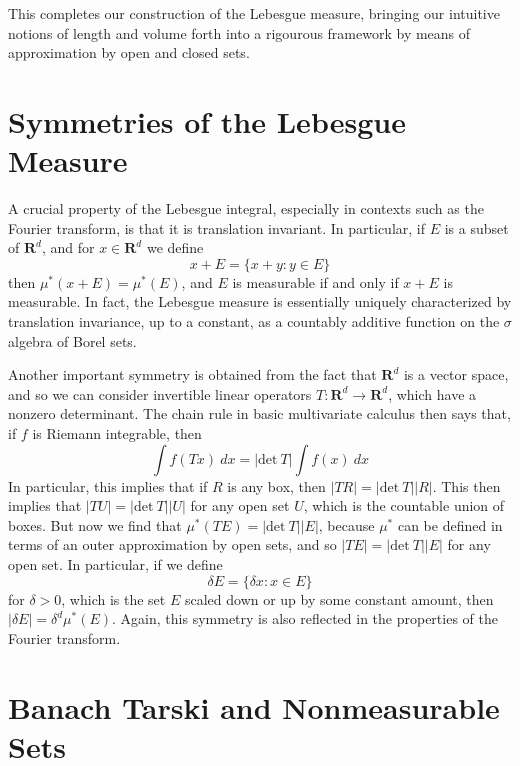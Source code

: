 This completes our construction of the Lebesgue measure, bringing our intuitive notions of length and volume forth into a rigourous framework by means of approximation by open and closed sets.

\section{Symmetries of the Lebesgue Measure}

A crucial property of the Lebesgue integral, especially in contexts such as the Fourier transform, is that it is translation invariant. In particular, if $E$ is a subset of $\mathbf{R}^d$, and for $x \in \mathbf{R}^d$ we define
%
\[ x + E = \{ x + y : y \in E \} \]
%
then $\mu^*(x + E) = \mu^*(E)$, and $E$ is measurable if and only if $x + E$ is measurable. In fact, the Lebesgue measure is essentially uniquely characterized by translation invariance, up to a constant, as a countably additive function on the $\sigma$ algebra of Borel sets.

Another important symmetry is obtained from the fact that $\mathbf{R}^d$ is a vector space, and so we can consider invertible linear operators $T: \mathbf{R}^d \to \mathbf{R}^d$, which have a nonzero determinant. The chain rule in basic multivariate calculus then says that, if $f$ is Riemann integrable, then
%
\[ \int f(Tx)\ dx = |\text{det}\ T|\int f(x)\ dx \]
%
In particular, this implies that if $R$ is any box, then $|TR| = |\text{det}\ T| |R|$. This then implies that $|TU| = |\text{det}\ T| |U|$ for any open set $U$, which is the countable union of boxes. But now we find that $\mu^*(TE) = |\text{det}\ T| |E|$, because $\mu^*$ can be defined in terms of an outer approximation by open sets, and so $|TE| = |\text{det}\ T| |E|$ for any open set. In particular, if we define
%
\[ \delta E = \{ \delta x: x \in E \} \]
%
for $\delta > 0$, which is the set $E$ scaled down or up by some constant amount, then $|\delta E| = \delta^d \mu^*(E)$. Again, this symmetry is also reflected in the properties of the Fourier transform.

\section{Banach Tarski and Nonmeasurable Sets}

